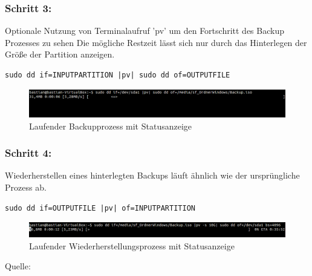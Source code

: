 \subsubsection*{Schritt 3:}
Optionale Nutzung von Terminalaufruf 'pv' um den Fortschritt des Backup Prozesses zu sehen Die mögliche Restzeit lässt sich nur durch das Hinterlegen der Größe der Partition anzeigen.
\begin{lstlisting}
sudo dd if=INPUTPARTITION |pv| sudo dd of=OUTPUTFILE
\end{lstlisting}
\begin{figure}[ht]
\includegraphics[width=\textwidth]{pictures/Bastian/BILD2_pv}
\caption{Laufender Backupprozess mit Statusanzeige}
\end{figure}
\subsubsection*{Schritt 4:}
Wiederherstellen eines hinterlegten Backups läuft ähnlich wie der ursprüngliche Prozess ab.
\begin{lstlisting}
sudo dd if=OUTPUTFILE |pv| of=INPUTPARTITION
\end{lstlisting}
\begin{figure}[ht]
\includegraphics[width=\textwidth]{pictures/Bastian/BILD3_pv}
\caption{Laufender Wiederherstellungsprozess mit Statusanzeige}
\end{figure}
Quelle: \cite{dd}
\newpage %

